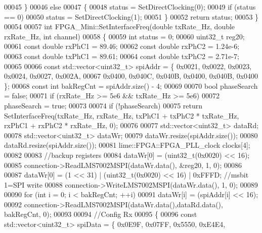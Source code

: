 \begin{DoxyCode}
00045     \}
00046     \textcolor{keywordflow}{else}
00047     \{
00048         status = SetDirectClocking(0);
00049         \textcolor{keywordflow}{if} (status == 0)
00050             status = SetDirectClocking(1);
00051     \}
00052     \textcolor{keywordflow}{return} status;
00053 \}
00054 
00057 \textcolor{keywordtype}{int} FPGA_Mini::SetInterfaceFreq(\textcolor{keywordtype}{double} txRate\_Hz, \textcolor{keywordtype}{double} rxRate\_Hz, \textcolor{keywordtype}{int} channel)
00058 \{
00059     \textcolor{keywordtype}{int} status = 0;
00060     uint32\_t reg20;
00061     \textcolor{keyword}{const} \textcolor{keywordtype}{double} rxPhC1 = 89.46;
00062     \textcolor{keyword}{const} \textcolor{keywordtype}{double} rxPhC2 = 1.24e-6;
00063     \textcolor{keyword}{const} \textcolor{keywordtype}{double} txPhC1 = 89.61;
00064     \textcolor{keyword}{const} \textcolor{keywordtype}{double} txPhC2 = 2.71e-7;
00065 
00066     \textcolor{keyword}{const} std::vector<uint32\_t> spiAddr = \{ 0x0021, 0x0022, 0x0023, 0x0024, 0x0027, 0x002A,
00067                                             0x0400, 0x040C, 0x040B, 0x0400, 0x040B, 0x0400 \};
00068     \textcolor{keyword}{const} \textcolor{keywordtype}{int} bakRegCnt = spiAddr.size() - 4;
00069 
00070     \textcolor{keywordtype}{bool} phaseSearch = \textcolor{keyword}{false};
00071     \textcolor{keywordflow}{if} (rxRate\_Hz >= 5e6 && txRate\_Hz >= 5e6)
00072         phaseSearch = \textcolor{keyword}{true};
00073 
00074     \textcolor{keywordflow}{if} (!phaseSearch)
00075         \textcolor{keywordflow}{return} SetInterfaceFreq(txRate\_Hz, rxRate\_Hz, txPhC1 + txPhC2 * txRate\_Hz, rxPhC1 + rxPhC2 * 
      rxRate\_Hz, 0);
00076 
00077     std::vector<uint32\_t> dataRd;
00078     std::vector<uint32\_t> dataWr;
00079     dataWr.resize(spiAddr.size());
00080     dataRd.resize(spiAddr.size());
00081     lime::FPGA::FPGA_PLL_clock clocks[4];
00082 
00083     \textcolor{comment}{//backup registers}
00084     dataWr[0] = (uint32\_t(0x0020) << 16);
00085     connection->ReadLMS7002MSPI(dataWr.data(), &reg20, 1, 0);
00086 
00087     dataWr[0] = (1 << 31) | (uint32\_t(0x0020) << 16) | 0xFFFD; \textcolor{comment}{//msbit 1=SPI write}
00088     connection->WriteLMS7002MSPI(dataWr.data(), 1, 0);
00089 
00090     \textcolor{keywordflow}{for} (\textcolor{keywordtype}{int} i = 0; i < bakRegCnt; ++i)
00091         dataWr[i] = (spiAddr[i] << 16);
00092         connection->ReadLMS7002MSPI(dataWr.data(),dataRd.data(), bakRegCnt, 0);
00093 
00094     \textcolor{comment}{//Config Rx}
00095     \{
00096         \textcolor{keyword}{const} std::vector<uint32\_t> spiData = \{ 0x0E9F, 0x07FF, 0x5550, 0xE4E4,

\end{DoxyCode}
